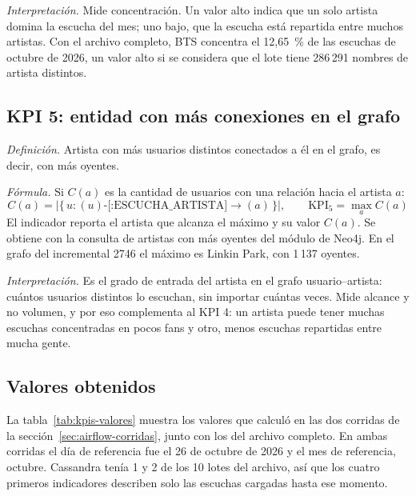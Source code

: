 \textit{Interpretación.} Mide concentración. Un valor alto indica que un solo artista domina la escucha del mes; uno bajo, que la escucha está repartida entre muchos artistas. Con el archivo completo, BTS concentra el 12,65~\% de las escuchas de octubre de 2026, un valor alto si se considera que el lote tiene 286\,291 nombres de artista distintos.

\subsection{KPI 5: entidad con más conexiones en el grafo}

\textit{Definición.} Artista con más usuarios distintos conectados a él en el grafo, es decir, con más oyentes.

\textit{Fórmula.} Si $C(a)$ es la cantidad de usuarios con una relación  hacia el artista $a$:
\[
C(a) = \left|\{\, u : (u)\text{-[:ESCUCHA\_ARTISTA]}\rightarrow(a) \,\}\right|, \qquad \text{KPI}_5 = \max_{a} C(a)
\]
El indicador reporta el artista que alcanza el máximo y su valor $C(a)$. Se obtiene con la consulta de artistas con más oyentes del módulo de Neo4j. En el grafo del incremental 2746 el máximo es Linkin Park, con 1\,137 oyentes.

\textit{Interpretación.} Es el grado de entrada del artista en el grafo usuario--artista: cuántos usuarios distintos lo escuchan, sin importar cuántas veces. Mide alcance y no volumen, y por eso complementa al KPI 4: un artista puede tener muchas escuchas concentradas en pocos fans y otro, menos escuchas repartidas entre mucha gente.

\subsection{Valores obtenidos}

La tabla~\ref{tab:kpis-valores} muestra los valores que calculó  en las dos corridas de la sección~\ref{sec:airflow-corridas}, junto con los del archivo completo. En ambas corridas el día de referencia fue el 26 de octubre de 2026 y el mes de referencia, octubre. Cassandra tenía 1 y 2 de los 10 lotes del archivo, así que los cuatro primeros indicadores describen solo las escuchas cargadas hasta ese momento.


